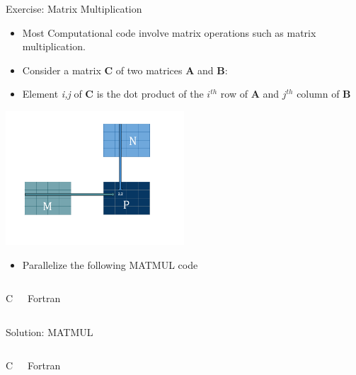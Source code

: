 \documentclass[c,mathserif,compress,xcolor=svgnames]{beamer}
\newenvironment{bblock}[0]
{
\begin{beamerboxesrounded}[upper=uppercol1,lower=lowercol1,shadow=true]}
{\end{beamerboxesrounded}}
\newenvironment{eblock}[0]
{
\begin{beamerboxesrounded}[upper=uppercol2,lower=lowercol2,shadow=true]}
{\end{beamerboxesrounded}}
\begin{document}
\begin{frame}[allowframebreaks]{\small Exercise: Matrix Multiplication}
  \begin{itemize}
    \item Most Computational code involve matrix operations such as matrix multiplication.
    \item Consider a matrix {\bf C} of two matrices {\bf A} and {\bf B}:
    \item[] Element {\it i,j} of {\bf C} is the dot product of the $i^{th}$ row of {\bf A} and $j^{th}$ column of {\bf B}
  \end{itemize}
  \begin{center}
    \includegraphics[width=0.5\textwidth]{./matmul}
  \end{center}
  \begin{itemize}
    \item Parallelize the following MATMUL code
  \end{itemize}
  \begin{columns}
    \begin{bblock}{C}
      
    \end{bblock}
    \begin{bblock}{Fortran}
      
    \end{bblock}
  \end{columns}
\end{frame}

\begin{frame}{\small Solution: MATMUL}
  \begin{columns}
    \begin{eblock}{C}
      
    \end{eblock}
    \begin{eblock}{Fortran}
      
    \end{eblock}
  \end{columns}
\end{frame}
\end{document}
